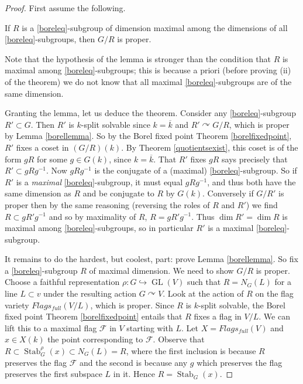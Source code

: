 \documentclass[10pt]{article}
\renewcommand{\(}{\left(}
\renewcommand{\)}{\right)}
\newcommand{\actson}{\curvearrowright}
\numberwithin{thm}{subsection}
\begin{document}
\begin{proof}
First assume the following.
\begin{lem}\label{borellemma}
If $R$ is a \eqref{boreleq}-subgroup
of dimension maximal among the dimensions of
all \eqref{boreleq}-subgroups,
then $G/R$ is proper.
\end{lem}
Note that the hypothesis of the lemma is stronger
than the condition that $R$ is maximal among \eqref{boreleq}-subgroups;
this is because a priori (before proving (ii) of the theorem)
we do not know that all maximal \eqref{boreleq}-subgroups are of the same dimension.

Granting the lemma, let us deduce the theorem.
Consider any \eqref{boreleq}-subgroup $R'\subset G$.
Then $R'$ is $k$-split solvable since $k=\overline{k}$
and $R'\actson G/R$, which is proper by Lemma \ref{borellemma}.
So by the Borel fixed point Theorem \ref{borelfixedpoint},
$R'$ fixes a coset in $(G/R)(k)$.
By Theorem \ref{quotientsexist}, this coset is of the form $gR$ for some $g\in G(k)$,
since $k=\overline{k}$.
That $R'$ fixes $gR$ says precisely
that $R'\subset g R g^{-1}$.
Now $gRg^{-1}$ is the conjugate of a (maximal) \eqref{boreleq}-subgroup.
So if $R'$ is a \textit{maximal} \eqref{boreleq}-subgroup,
it must equal $gRg^{-1}$, and thus both have
the same dimension as $R$
and be conjugate to $R$ by $G(k)$.
Conversely if $G/R'$ is proper then by the same reasoning (reversing the roles
of $R$ and $R'$) we find $R\subset gR'g^{-1}$
and so by maximality of $R$, $R=gR'g^{-1}$.
Thus $\dim R'=\dim R$ is maximal among \eqref{boreleq}-subgroups,
so in particular $R'$ is a maximal \eqref{boreleq}-subgroup.
 
It remains to do the hardest, but coolest, part: prove Lemma \ref{borellemma}. 
So fix a \eqref{boreleq}-subgroup $R$ of maximal dimension.
We need to show $G/R$ is proper.
Choose a faithful representation $\rho:G\hookrightarrow\operatorname{GL}(V)$
such that $R=N_G(L)$ for a line $L\subset v$
under the resulting action $G\actson V$.
Look at the action of $R$
on the flag variety $Flags_{full}(V/L)$, which is proper.
Since $R$ is $k$-split solvable,
the Borel fixed point Theorem \ref{borelfixedpoint}
entails that $R$ fixes a flag in $V/L$.
We can lift this to a maximal flag $\mathcal{F}$ in $V$
starting with $L$.
Let $X=Flags_{full}(V)$
and $x\in X(k)$ the point corresponding to $\mathcal{F}$.
Observe that $R\subset \operatorname{Stab}^\rho_G(x)\subset N_G(L)=R$,
where the first inclusion is because $R$ preserves the flag $\mathcal{F}$
and the second is because any $g$ which preserves the flag
preserves the first subspace $L$ in it.
Hence $R=\operatorname{Stab}_G(x)$.


\end{proof}
\end{document}

